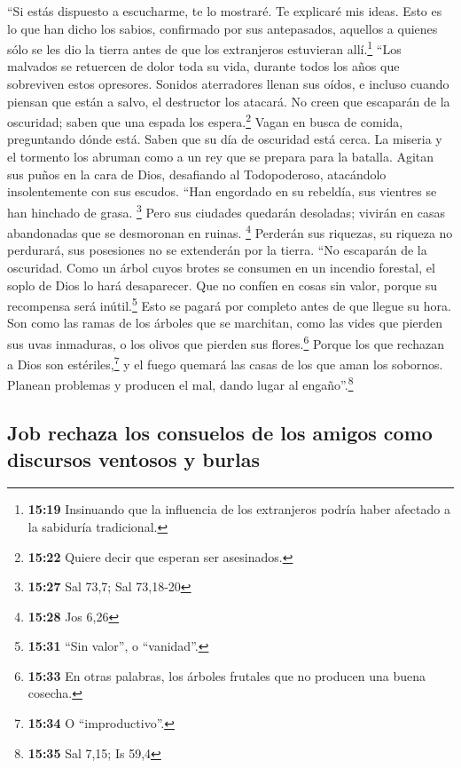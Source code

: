  ``Si estás dispuesto a escucharme, te lo mostraré. Te
explicaré mis ideas.  Esto es lo que han dicho los
sabios, confirmado por sus antepasados,  aquellos a
quienes sólo se les dio la tierra antes de que los extranjeros
estuvieran allí.\footnote{\textbf{15:19} Insinuando que la influencia de
  los extranjeros podría haber afectado a la sabiduría tradicional.}
 ``Los malvados se retuercen de dolor toda su vida,
durante todos los años que sobreviven estos opresores. 
Sonidos aterradores llenan sus oídos, e incluso cuando piensan que están
a salvo, el destructor los atacará.  No creen que
escaparán de la oscuridad; saben que una espada los espera.\footnote{\textbf{15:22}
  Quiere decir que esperan ser asesinados.}  Vagan en
busca de comida, preguntando dónde está. Saben que su día de oscuridad
está cerca.  La miseria y el tormento los abruman como a
un rey que se prepara para la batalla.  Agitan sus puños
en la cara de Dios, desafiando al Todopoderoso, 
atacándolo insolentemente con sus escudos.  ``Han
engordado en su rebeldía, sus vientres se han hinchado de grasa.
\footnote{\textbf{15:27} Sal 73,7; Sal 73,18-20}  Pero
sus ciudades quedarán desoladas; vivirán en casas abandonadas que se
desmoronan en ruinas. \footnote{\textbf{15:28} Jos 6,26} 
Perderán sus riquezas, su riqueza no perdurará, sus posesiones no se
extenderán por la tierra.  ``No escaparán de la
oscuridad. Como un árbol cuyos brotes se consumen en un incendio
forestal, el soplo de Dios lo hará desaparecer.  Que no
confíen en cosas sin valor, porque su recompensa será inútil.\footnote{\textbf{15:31}
  ``Sin valor'', o ``vanidad''.}  Esto se pagará por
completo antes de que llegue su hora. Son como las ramas de los árboles
que se marchitan,  como las vides que pierden sus uvas
inmaduras, o los olivos que pierden sus flores.\footnote{\textbf{15:33}
  En otras palabras, los árboles frutales que no producen una buena
  cosecha.}  Porque los que rechazan a Dios son
estériles,\footnote{\textbf{15:34} O ``improductivo''.} y el fuego
quemará las casas de los que aman los sobornos.  Planean
problemas y producen el mal, dando lugar al engaño''.\footnote{\textbf{15:35}
  Sal 7,15; Is 59,4}

\hypertarget{job-rechaza-los-consuelos-de-los-amigos-como-discursos-ventosos-y-burlas}{%
\subsection{Job rechaza los consuelos de los amigos como discursos
ventosos y
burlas}\label{job-rechaza-los-consuelos-de-los-amigos-como-discursos-ventosos-y-burlas}}

